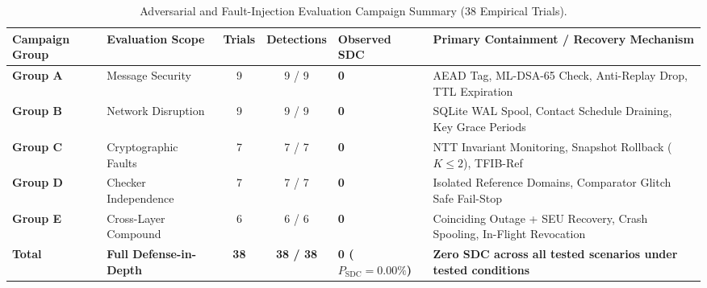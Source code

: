 \begin{table}[t]
\centering
\caption{Adversarial and Fault-Injection Evaluation Campaign Summary (38 Empirical Trials).}
\label{tab:fault_campaign_summary}
\small
\begin{tabular}{llccll}
\hline
\textbf{Campaign Group} & \textbf{Evaluation Scope} & \textbf{Trials} & \textbf{Detections} & \textbf{Observed SDC} & \textbf{Primary Containment / Recovery Mechanism} \\
\hline
\textbf{Group A} & Message Security & 9 & 9 / 9 & \textbf{0} & AEAD Tag, ML-DSA-65 Check, Anti-Replay Drop, TTL Expiration \\
\textbf{Group B} & Network Disruption & 9 & 9 / 9 & \textbf{0} & SQLite WAL Spool, Contact Schedule Draining, Key Grace Periods \\
\textbf{Group C} & Cryptographic Faults & 7 & 7 / 7 & \textbf{0} & NTT Invariant Monitoring, Snapshot Rollback ($K \le 2$), TFIB-Ref \\
\textbf{Group D} & Checker Independence & 7 & 7 / 7 & \textbf{0} & Isolated Reference Domains, Comparator Glitch Safe Fail-Stop \\
\textbf{Group E} & Cross-Layer Compound & 6 & 6 / 6 & \textbf{0} & Coinciding Outage + SEU Recovery, Crash Spooling, In-Flight Revocation \\
\hline
\textbf{Total} & \textbf{Full Defense-in-Depth} & \textbf{38} & \textbf{38 / 38} & \textbf{0 ($P_{\text{SDC}}=0.00\%$)} & \textbf{Zero SDC across all tested scenarios under tested conditions} \\
\hline
\end{tabular}
\end{table}
